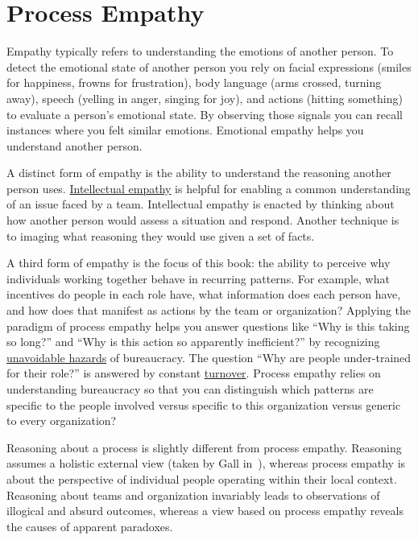 \section{Process Empathy\label{sec:process-empathy}}

Empathy typically refers to understanding the emotions of another person. To detect the emotional state of another person you rely on facial expressions (smiles for happiness, frowns for frustration), body language (arms crossed, turning away), speech (yelling in anger, singing for joy), and actions (hitting something) to evaluate a person's emotional state. By observing those signals you can recall instances where you felt similar emotions. Emotional empathy helps you understand another person. 

A distinct form of empathy is the ability to understand the reasoning another person uses.  
\hyperref[sec:intellectual-empathy]{Intellectual empathy} is helpful for enabling a common understanding of an issue faced by a team. Intellectual empathy is enacted by thinking about how another person would assess a situation and respond. Another technique is to imaging what reasoning they would use given a set of facts. 


A third form of empathy is the focus of this book: the ability to perceive why individuals working together behave in recurring patterns. For example, what incentives do people in each role have, what information does each person have, and how does that manifest as actions by the team or organization? Applying the paradigm of \gls{process empathy} helps you answer questions like ``Why is this taking so long?'' and ``Why is this action so apparently inefficient?'' by recognizing \hyperref[sec:unavoidable-hazards]{unavoidable hazards} of bureaucracy. The question ``Why are people under-trained for their role?'' is answered by constant \hyperref[sec:turnover]{turnover}. Process empathy relies on understanding bureaucracy so that you can distinguish which patterns are specific to the people involved versus specific to this organization versus generic to every organization?

Reasoning about a process is slightly different from process empathy. Reasoning assumes a holistic external view (taken by Gall in~\cite{2002_Gall}), whereas process empathy is about the perspective of individual people operating within their local context. Reasoning about teams and organization invariably leads to observations of illogical and absurd outcomes, whereas a view based on process empathy reveals the causes of apparent paradoxes.

